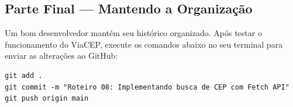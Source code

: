 \documentclass[12pt,a4paper]{article}
\begin{document}
\subsection{Parte Final — Mantendo a Organização}

\begin{boxAtividade}
Um bom desenvolvedor mantém seu histórico organizado. Após testar o funcionamento do ViaCEP, execute os comandos abaixo no seu terminal para enviar as alterações ao GitHub:

\begin{boxCodigo}
\begin{verbatim}
git add .
git commit -m "Roteiro 08: Implementando busca de CEP com Fetch API"
git push origin main
\end{verbatim}
\end{boxCodigo}
\end{boxAtividade}
\end{document}
